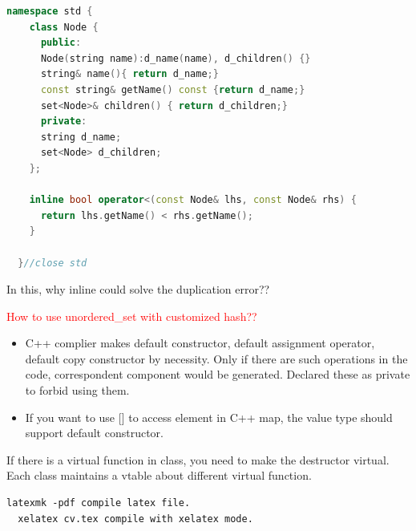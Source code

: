\documentclass[a4paper]{tufte-handout}
\begin{document}
\begin{lstlisting}[language=c++]
  namespace std {
    class Node {
      public:
      Node(string name):d_name(name), d_children() {}
      string& name(){ return d_name;}
      const string& getName() const {return d_name;}
      set<Node>& children() { return d_children;}
      private:
      string d_name;
      set<Node> d_children;
    };

    inline bool operator<(const Node& lhs, const Node& rhs) {
      return lhs.getName() < rhs.getName();
    }

  }//close std

\end{lstlisting}
In this, why inline could solve the duplication error??

\textcolor{red}{How to use unordered\_set with customized hash??}
\begin{itemize}
\item C++ complier makes default constructor, default assignment operator, default copy constructor by necessity. Only if there are such operations in the code, correspondent component would be generated. Declared these as private to forbid using them.\\
\item If you want to use [] to access element in C++ map, the value type should support default constructor.
\end{itemize}

If there is a virtual function in class, you need to make the destructor virtual.
Each class maintains a vtable about different virtual function.

\begin{lstlisting}[]
  latexmk -pdf compile latex file.
  xelatex cv.tex compile with xelatex mode.
\end{lstlisting}





\end{document}
